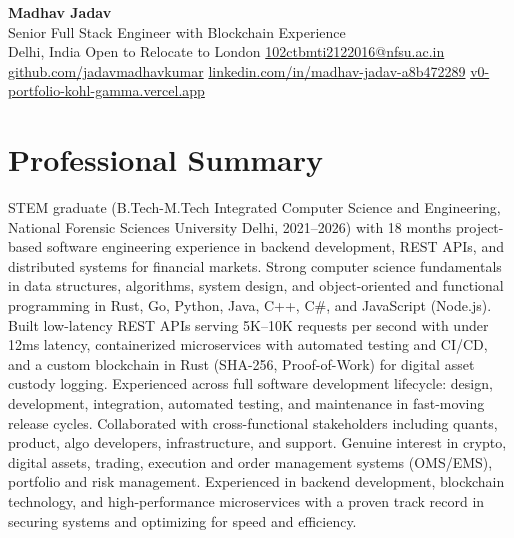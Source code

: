 \documentclass[9pt,letterpaper]{article}
\begin{document}
\begin{center}
{\LARGE \textbf{Madhav Jadav}}\\[2pt]
{\small Senior Full Stack Engineer with Blockchain Experience}\\[2pt]
{\small Delhi, India \textbar{} Open to Relocate to London \textbar{} \href{mailto:102ctbmti2122016@nfsu.ac.in}{102ctbmti2122016@nfsu.ac.in}}\\[2pt]
{\small \href{https://github.com/jadavmadhavkumar}{github.com/jadavmadhavkumar} \textbar{} \href{https://www.linkedin.com/in/madhav-jadav-a8b472289}{linkedin.com/in/madhav-jadav-a8b472289} \textbar{} \href{http://v0-portfolio-kohl-gamma.vercel.app}{v0-portfolio-kohl-gamma.vercel.app}}\\
\end{center}

\section{Professional Summary}
STEM graduate (B.Tech-M.Tech Integrated Computer Science and Engineering, National Forensic Sciences University Delhi, 2021--2026) with 18 months project-based software engineering experience in backend development, REST APIs, and distributed systems for financial markets. Strong computer science fundamentals in data structures, algorithms, system design, and object-oriented and functional programming in Rust, Go, Python, Java, C++, C\#, and JavaScript (Node.js). Built low-latency REST APIs serving 5K--10K requests per second with under 12ms latency, containerized microservices with automated testing and CI/CD, and a custom blockchain in Rust (SHA-256, Proof-of-Work) for digital asset custody logging. Experienced across full software development lifecycle: design, development, integration, automated testing, and maintenance in fast-moving release cycles. Collaborated with cross-functional stakeholders including quants, product, algo developers, infrastructure, and support. Genuine interest in crypto, digital assets, trading, execution and order management systems (OMS/EMS), portfolio and risk management. Experienced in backend development, blockchain technology, and high-performance microservices with a proven track record in securing systems and optimizing for speed and efficiency.

\end{document}

